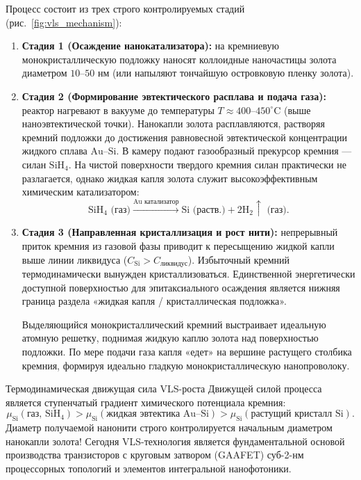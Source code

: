 \documentclass[12pt,a4paper]{article}
\begin{document}
Процесс состоит из трех строго контролируемых стадий (рис.~\ref{fig:vls_mechanism}):
\begin{enumerate}
    \item \textbf{Стадия 1 (Осаждение нанокатализатора):} на кремниевую монокристаллическую подложку наносят коллоидные наночастицы золота диаметром $10\text{--}50\text{ нм}$ (или напыляют тончайшую островковую пленку золота).
    \item \textbf{Стадия 2 (Формирование эвтектического расплава и подача газа):} реактор нагревают в вакууме до температуры $T \approx 400\text{--}450^\circ\mathrm{C}$ (выше наноэвтектической точки). Нанокапли золота расплавляются, растворяя кремний подложки до достижения равновесной эвтектической концентрации жидкого сплава $\mathrm{Au\text{--}Si}$.
    В камеру подают газообразный прекурсор кремния --- силан $\mathrm{SiH}_4$. На чистой поверхности твердого кремния силан практически не разлагается, однако жидкая капля золота служит высокоэффективным химическим катализатором:
    \begin{equation}
    \mathrm{SiH}_4\text{ (газ)} \xrightarrow{\mathrm{Au\text{ катализатор}}} \mathrm{Si}\text{ (раств.)} + 2\mathrm{H}_2\uparrow\text{ (газ)}.
    \label{eq:silane_decomposition}
    \end{equation}
    \item \textbf{Стадия 3 (Направленная кристаллизация и рост нити):} непрерывный приток кремния из газовой фазы приводит к пересыщению жидкой капли выше линии ликвидуса ($C_{\mathrm{Si}} > C_{\mathrm{ликвидус}}$). Избыточный кремний термодинамически вынужден кристаллизоваться. Единственной энергетически доступной поверхностью для эпитаксиального осаждения является нижняя граница раздела «жидкая капля / кристаллическая подложка». 
    
    Выделяющийся монокристаллический кремний выстраивает идеальную атомную решетку, поднимая жидкую каплю золота над поверхностью подложки. По мере подачи газа капля «едет» на вершине растущего столбика кремния, формируя идеально гладкую монокристаллическую нанопроволоку.
\end{enumerate}

\begin{lawbox}{Термодинамическая движущая сила VLS-роста}
Движущей силой процесса является ступенчатый градиент химического потенциала кремния:
\begin{equation}
\mu_{\mathrm{Si}}(\text{газ, } \mathrm{SiH}_4) > \mu_{\mathrm{Si}}(\text{жидкая эвтектика } \mathrm{Au\text{--}Si}) > \mu_{\mathrm{Si}}(\text{растущий кристалл } \mathrm{Si}).
\label{eq:vls_driving_force}
\end{equation}
Диаметр получаемой нанонити строго контролируется начальным диаметром нанокапли золота! Сегодня VLS-технология является фундаментальной основой производства транзисторов с круговым затвором (GAAFET) суб-2-нм процессорных топологий и элементов интегральной нанофотоники.
\end{lawbox}
\end{document}
